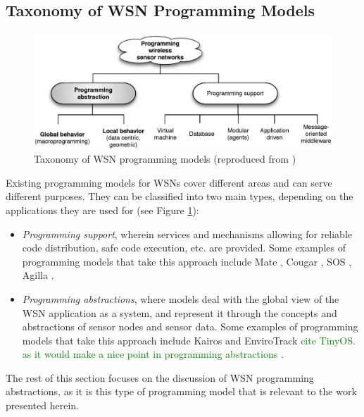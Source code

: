 \subsection{Taxonomy of WSN Programming Models}

\begin{figure}
\centering
\label{Fig:ProgrammingModels}
\includegraphics[scale=0.6]{img/ProgrammingAbstractions.eps} \caption[Taxonomy 
of WSN programming models]{Taxonomy of WSN programming models (reproduced from
\cite{hadim_middleware:2006})}
\end{figure}

Existing programming models for WSNs cover different areas and can serve 
different purposes. They can be classified into two main types, depending on 
the applications they are used for  \cite{hadim_middleware:2006} (see Figure
\ref{Fig:ProgrammingModels}):
\begin{itemize}
\item \emph{Programming support}, wherein services and mechanisms allowing for 
reliable code distribution, safe code execution, etc. are provided. Some
examples of programming models that take this approach include Mate
\cite{Levis_Mate:2002}, Cougar \cite{Bonnet_Cougar:2001}, SOS
\cite{Han_SOS:2005}, Agilla \cite{Fok_Agilla:2005}.
\item \emph{Programming abstractions}, where models deal with the global view 
of the WSN application as a system, and represent it through the concepts and 
abstractions of sensor nodes and sensor data. Some
examples of programming models that take this approach include Kairos
\cite{gummadi_Kairos:2005} and
EnviroTrack \cite{Abdelzaher_EnviroTrack:2004} 
\textcolor{green}{cite TinyOS. as it would make a nice point in programming
abstractions }.
\end{itemize}



The rest of this section focuses on the discussion of WSN programming
abstractions, as it is this type of programming model that is relevant to the
work presented herein.

